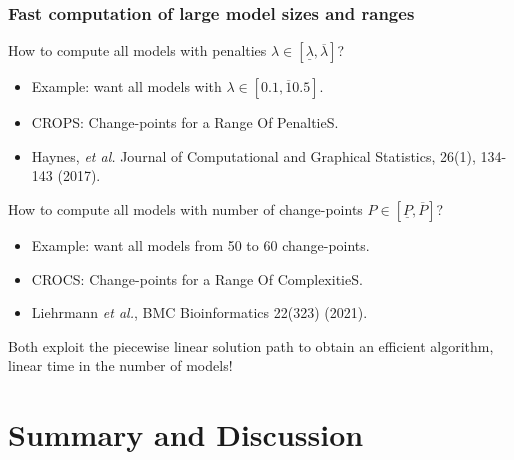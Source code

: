 \documentclass{beamer}
\begin{document}
\begin{frame}
  \frametitle{Fast computation of large model sizes and ranges}

  How to compute all models with penalties $\lambda\in[\underline \lambda, \overline \lambda]$?
  \begin{itemize}
  \item Example: want all models with $\lambda\in[0.1, \overline 10.5]$.
  \item CROPS: Change-points for a Range Of PenaltieS.
  \item Haynes, \emph{et al.} Journal of Computational and Graphical Statistics, 26(1), 134-143 (2017).
  \end{itemize}
  
  How to compute all models with number of change-points $P\in[\underline P, \overline P]$?
  \begin{itemize}
  \item Example: want all models from 50 to 60 change-points.
  \item CROCS: Change-points for a Range Of ComplexitieS.
  \item Liehrmann \emph{et al.}, BMC Bioinformatics 22(323) (2021).
  \end{itemize}
  Both exploit the piecewise linear solution path to obtain an efficient algorithm, linear time in the number of models!
  
\end{frame}

\section{Summary and Discussion}
\end{document}
